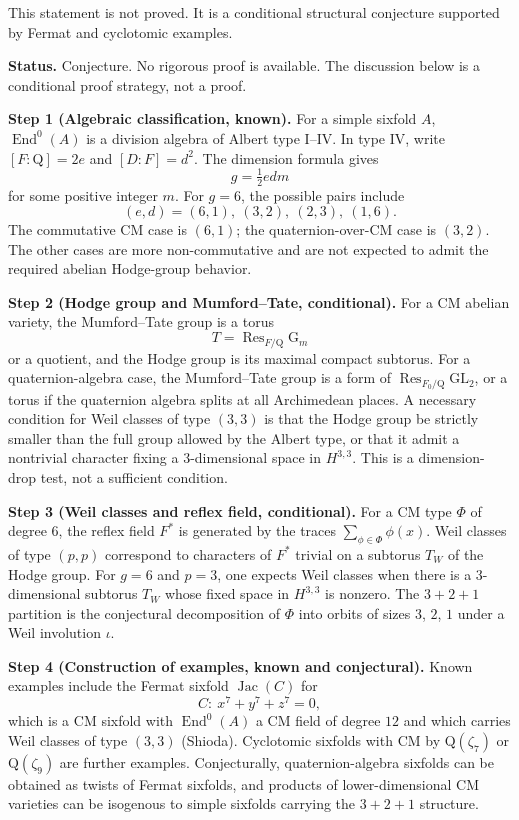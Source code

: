 \documentclass{article}
\newcommand{\mathbb}[1]{\mathrm{#1}}
\begin{document}
This statement is not proved. It is a conditional structural conjecture supported by Fermat and cyclotomic examples.

\medskip
\noindent\textbf{Status.} Conjecture. No rigorous proof is available. The discussion below is a conditional proof strategy, not a proof.

\medskip
\noindent\textbf{Step 1 (Algebraic classification, known).}
For a simple sixfold \(A\), \(\operatorname{End}^0(A)\) is a division algebra of Albert type I--IV. In type IV, write \([F:\mathbb{Q}]=2e\) and \([D:F]=d^2\). The dimension formula gives
\[
g=\tfrac12 e d m
\]
for some positive integer \(m\). For \(g=6\), the possible pairs include
\[
(e,d)=(6,1),\ (3,2),\ (2,3),\ (1,6).
\]
The commutative CM case is \((6,1)\); the quaternion-over-CM case is \((3,2)\). The other cases are more non-commutative and are not expected to admit the required abelian Hodge-group behavior.

\medskip
\noindent\textbf{Step 2 (Hodge group and Mumford--Tate, conditional).}
For a CM abelian variety, the Mumford--Tate group is a torus
\[
T=\operatorname{Res}_{F/\mathbb{Q}}\mathbb{G}_m
\]
or a quotient, and the Hodge group is its maximal compact subtorus. For a quaternion-algebra case, the Mumford--Tate group is a form of \(\operatorname{Res}_{F_0/\mathbb{Q}}\mathrm{GL}_2\), or a torus if the quaternion algebra splits at all Archimedean places. A necessary condition for Weil classes of type \((3,3)\) is that the Hodge group be strictly smaller than the full group allowed by the Albert type, or that it admit a nontrivial character fixing a \(3\)-dimensional space in \(H^{3,3}\). This is a dimension-drop test, not a sufficient condition.

\medskip
\noindent\textbf{Step 3 (Weil classes and reflex field, conditional).}
For a CM type \(\Phi\) of degree \(6\), the reflex field \(F^*\) is generated by the traces \(\sum_{\phi\in\Phi}\phi(x)\). Weil classes of type \((p,p)\) correspond to characters of \(F^*\) trivial on a subtorus \(T_W\) of the Hodge group. For \(g=6\) and \(p=3\), one expects Weil classes when there is a \(3\)-dimensional subtorus \(T_W\) whose fixed space in \(H^{3,3}\) is nonzero. The \(3+2+1\) partition is the conjectural decomposition of \(\Phi\) into orbits of sizes \(3\), \(2\), \(1\) under a Weil involution \(\iota\).

\medskip
\noindent\textbf{Step 4 (Construction of examples, known and conjectural).}
Known examples include the Fermat sixfold \(\operatorname{Jac}(C)\) for
\[
C:\ x^7+y^7+z^7=0,
\]
which is a CM sixfold with \(\operatorname{End}^0(A)\) a CM field of degree \(12\) and which carries Weil classes of type \((3,3)\) (Shioda). Cyclotomic sixfolds with CM by \(\mathbb{Q}(\zeta_7)\) or \(\mathbb{Q}(\zeta_9)\) are further examples. Conjecturally, quaternion-algebra sixfolds can be obtained as twists of Fermat sixfolds, and products of lower-dimensional CM varieties can be isogenous to simple sixfolds carrying the \(3+2+1\) structure.
\end{document}
